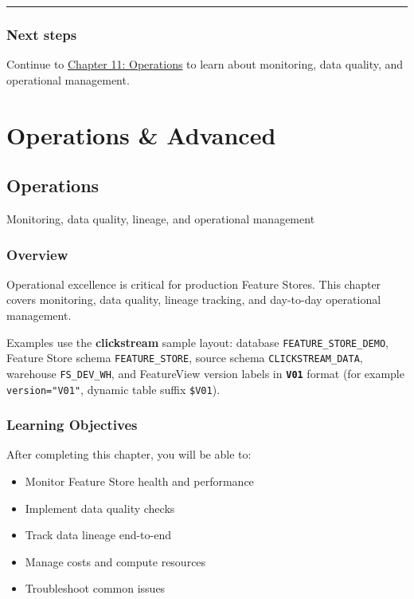 \documentclass[
  letterpaper,
  DIV=11,
  numbers=noendperiod]{scrreprt}
\providecommand{\tightlist}{%
  \setlength{\itemsep}{0pt}\setlength{\parskip}{0pt}}\usepackage{longtable,booktabs,array}
\begin{document}
\begin{center}\rule{0.5\linewidth}{0.5pt}\end{center}

\hypertarget{next-steps-10}{%
\section{Next steps}\label{next-steps-10}}

Continue to \protect\hyperlink{operations}{Chapter 11: Operations} to
learn about monitoring, data quality, and operational management.

\part{Operations \& Advanced}

\hypertarget{operations}{%
\chapter{Operations}\label{operations}}

Monitoring, data quality, lineage, and operational management

\hfill\break

\hypertarget{overview-11}{%
\section{Overview}\label{overview-11}}

Operational excellence is critical for production Feature Stores. This
chapter covers monitoring, data quality, lineage tracking, and
day-to-day operational management.

Examples use the \textbf{clickstream} sample layout: database
\texttt{FEATURE\_STORE\_DEMO}, Feature Store schema
\texttt{FEATURE\_STORE}, source schema \texttt{CLICKSTREAM\_DATA},
warehouse \texttt{FS\_DEV\_WH}, and FeatureView version labels in
\textbf{\texttt{V01}} format (for example \texttt{version="V01"},
dynamic table suffix \texttt{\$V01}).

\hypertarget{learning-objectives-10}{%
\section{Learning Objectives}\label{learning-objectives-10}}

After completing this chapter, you will be able to:

\begin{itemize}
\tightlist
\item
  Monitor Feature Store health and performance
\item
  Implement data quality checks
\item
  Track data lineage end-to-end
\item
  Manage costs and compute resources
\item
  Troubleshoot common issues
\end{itemize}
\end{document}
